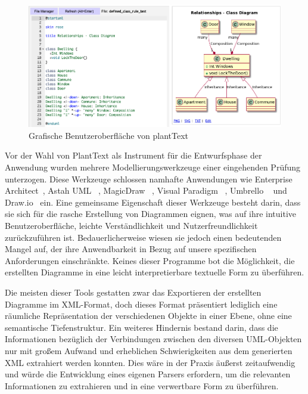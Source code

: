\begin{figure}
    \centering
    \includegraphics[width=15cm]{images/plantText}
    \caption{Grafische Benutzeroberfläche von plantText}
    \label{fig:plant-text}
\end{figure}

Vor der Wahl von PlantText als Instrument für die Entwurfsphase der Anwendung wurden mehrere Modellierungswerkzeuge
einer eingehenden Prüfung unterzogen. Diese Werkzeuge schlossen namhafte Anwendungen wie Enterprise Architect~\cite{enterarch},
Astah UML ~\cite{astah}, MagicDraw ~\cite{magic}, Visual Paradigm ~\cite{visual}, Umbrello ~\cite{umbrello} und Draw.io~\cite{draw} ein.
Eine gemeinsame Eigenschaft dieser Werkzeuge besteht darin, dass sie sich für die rasche Erstellung von Diagrammen
eignen, was auf ihre intuitive Benutzeroberfläche, leichte Verständlichkeit und Nutzerfreundlichkeit zurückzuführen ist.
Bedauerlicherweise wiesen sie jedoch einen bedeutenden Mangel auf, der ihre Anwendbarkeit in Bezug auf unsere
spezifischen Anforderungen einschränkte. Keines dieser Programme bot die Möglichkeit, die erstellten Diagramme in eine
leicht interpretierbare textuelle Form zu überführen.

Die meisten dieser Tools gestatten zwar das Exportieren der erstellten Diagramme im XML-Format, doch dieses Format
präsentiert lediglich eine räumliche Repräsentation der verschiedenen Objekte in einer Ebene, ohne eine semantische
Tiefenstruktur. Ein weiteres Hindernis bestand darin, dass die Informationen bezüglich der Verbindungen zwischen den
diversen UML-Objekten nur mit großem Aufwand und erheblichen Schwierigkeiten aus dem generierten XML extrahiert werden
konnten. Dies wäre in der Praxis äußerst zeitaufwendig und würde die Entwicklung eines eigenen Parsers erfordern, um die
relevanten Informationen zu extrahieren und in eine verwertbare Form zu überführen.

